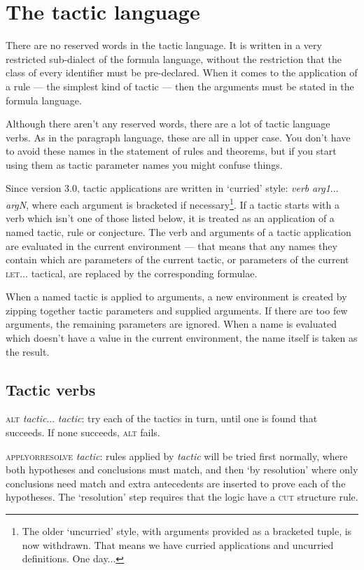 \chapter{The tactic language}
\label{appx:tacticlang}


There are no reserved words in the tactic language. It is written in a very restricted sub-dialect of the formula language, without the restriction that the class of every identifier must be pre-declared. When it comes to the application of a rule --- the simplest kind of tactic --- then the arguments must be stated in the formula language.


Although there aren't any reserved words, there are a lot of tactic language verbs. As in the paragraph language, these are all in upper case. You don't have to avoid these names in the statement of rules and theorems, but if you start using them as tactic parameter names you might confuse things.


Since version 3.0, tactic applications are written in `curried' style: \textit{verb} \textit{arg1}... \textit{argN}, where each argument is bracketed if necessary\footnote{The older `uncurried' style, with arguments provided as a bracketed tuple, is now withdrawn. That means we have curried applications and uncurried definitions. One day...}. If a tactic starts with a verb which isn't one of those listed below, it is treated as an application of a named tactic, rule or conjecture. The verb and arguments of a tactic application are evaluated in the current environment --- that means that any names they contain which are parameters of the current tactic, or parameters of the current \textsc{let...} tactical, are replaced by the corresponding formulae.


When a named tactic is applied to arguments, a new environment is created by zipping together tactic parameters and supplied arguments. If there are too few arguments, the remaining parameters are ignored. When a name is evaluated which doesn't have a value in the current environment, the name itself is taken as the result.


\section{Tactic verbs}


\textsc{alt} \textit{tactic}... \textit{tactic}: try each of the tactics in turn, until one is found that succeeds. If none succeeds, \textsc{alt} fails.


\textsc{applyorresolve} \textit{tactic}: rules applied by \textit{tactic} will be tried first normally, where both hypotheses and conclusions must match, and then `by resolution' where only conclusions need match and extra antecedents are inserted to prove each of the hypotheses. The `resolution' step requires that the logic have a \textsc{cut} structure rule.


